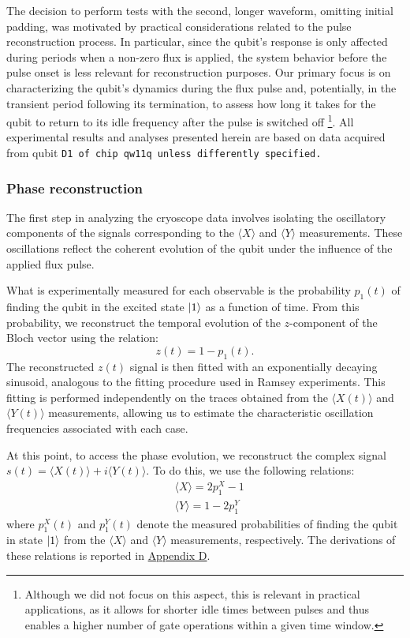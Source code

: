 The decision to perform tests with the second, longer waveform, omitting initial padding, was motivated by practical considerations related to the pulse reconstruction process. 
In particular, since the qubit's response is only affected during periods when a non-zero flux is applied, the system behavior before the pulse onset is less relevant for reconstruction purposes.
Our primary focus is on characterizing the qubit's dynamics during the flux pulse and, potentially, in the transient period following its termination, to assess how long it takes for the qubit to return to its idle frequency after the pulse is switched off
\footnote{Although we did not focus on this aspect, this is relevant in practical applications, as it allows for shorter idle times between pulses and thus enables a higher number of gate operations within a given time window.}.
All experimental results and analyses presented herein are based on data acquired from qubit \tt{D1} of chip \tt{qw11q} unless differently specified.

\subsubsection{Phase reconstruction}
The first step in analyzing the cryoscope data involves isolating the oscillatory components of the signals corresponding to the $\langle X \rangle$ and $\langle Y \rangle$ measurements. 
These oscillations reflect the coherent evolution of the qubit under the influence of the applied flux pulse.

What is experimentally measured for each observable is the probability $p_1(t)$ of finding the qubit in the excited state $\ket{1}$ as a function of time. 
From this probability, we reconstruct the temporal evolution of the $z$-component of the Bloch vector using the relation:
\begin{equation}
z(t) = 1 - p_1(t).
\end{equation}
The reconstructed $z(t)$ signal is then fitted with an exponentially decaying sinusoid, analogous to the fitting procedure used in Ramsey experiments.
This fitting is performed independently on the traces obtained from the $\langle X(t) \rangle$ and $\langle Y(t) \rangle$ measurements, allowing us to estimate the characteristic oscillation frequencies associated with each case.

At this point, to access the phase evolution, we reconstruct the complex signal $s(t) = \langle X(t) \rangle + i\langle Y(t) \rangle$. 
To do this, we use the following relations:
\begin{align}
    & \langle X \rangle = 2p^X_1 - 1 \\
    & \langle Y \rangle = 1 - 2p^Y_1
\end{align}
where $p^X_1(t)$ and $p^Y_1(t)$ denote the measured probabilities of finding the qubit in state $\ket{1}$ from the $\langle X \rangle$ and $\langle Y \rangle$ measurements, respectively.
The derivations of these relations is reported in \hyperref[app:AppendixD]{Appendix D}.

